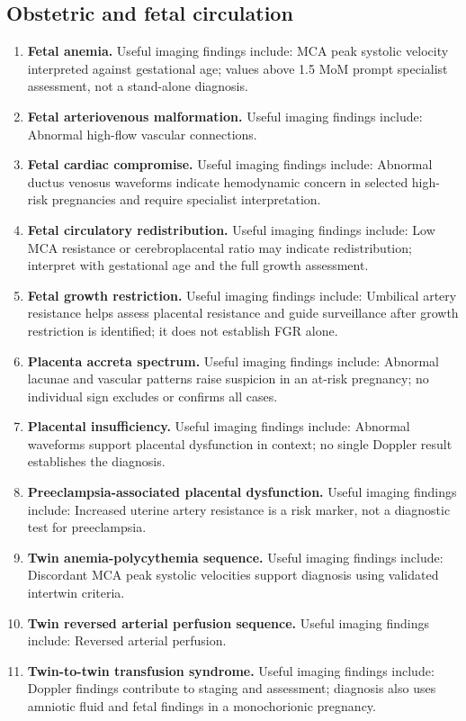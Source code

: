 \subsection{Obstetric and fetal circulation}
\begin{enumerate}[leftmargin=*,itemsep=0.45em,topsep=0.4em]
\item \textbf{Fetal anemia.} Useful imaging findings include: MCA peak systolic velocity interpreted against gestational age; values above 1.5 MoM prompt specialist assessment, not a stand-alone diagnosis.
\item \textbf{Fetal arteriovenous malformation.} Useful imaging findings include: Abnormal high-flow vascular connections.
\item \textbf{Fetal cardiac compromise.} Useful imaging findings include: Abnormal ductus venosus waveforms indicate hemodynamic concern in selected high-risk pregnancies and require specialist interpretation.
\item \textbf{Fetal circulatory redistribution.} Useful imaging findings include: Low MCA resistance or cerebroplacental ratio may indicate redistribution; interpret with gestational age and the full growth assessment.
\item \textbf{Fetal growth restriction.} Useful imaging findings include: Umbilical artery resistance helps assess placental resistance and guide surveillance after growth restriction is identified; it does not establish FGR alone.
\item \textbf{Placenta accreta spectrum.} Useful imaging findings include: Abnormal lacunae and vascular patterns raise suspicion in an at-risk pregnancy; no individual sign excludes or confirms all cases.
\item \textbf{Placental insufficiency.} Useful imaging findings include: Abnormal waveforms support placental dysfunction in context; no single Doppler result establishes the diagnosis.
\item \textbf{Preeclampsia-associated placental dysfunction.} Useful imaging findings include: Increased uterine artery resistance is a risk marker, not a diagnostic test for preeclampsia.
\item \textbf{Twin anemia-polycythemia sequence.} Useful imaging findings include: Discordant MCA peak systolic velocities support diagnosis using validated intertwin criteria.
\item \textbf{Twin reversed arterial perfusion sequence.} Useful imaging findings include: Reversed arterial perfusion.
\item \textbf{Twin-to-twin transfusion syndrome.} Useful imaging findings include: Doppler findings contribute to staging and assessment; diagnosis also uses amniotic fluid and fetal findings in a monochorionic pregnancy.

\end{enumerate}
